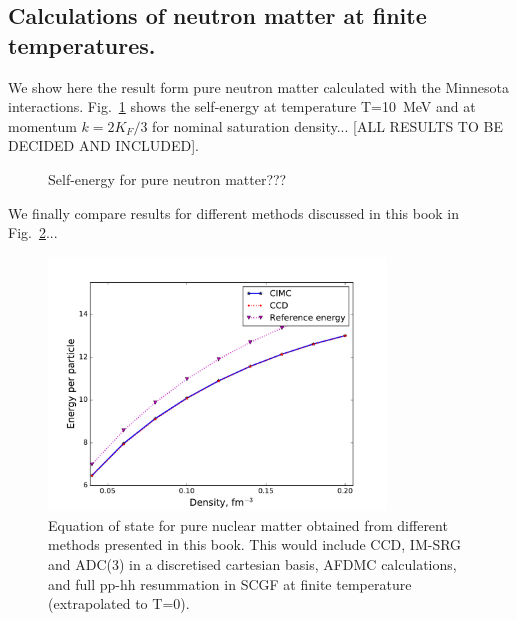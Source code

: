 \subsection{Calculations of neutron matter at finite temperatures.}
\label{sec:scgf_comp_finiteT}

We show here the result form pure neutron matter calculated with the Minnesota interactions. Fig.~\ref{fig:minn_SE} shows the self-energy at temperature
T=10~MeV and at momentum $k=2 K_F/3$  for nominal saturation density...  [ALL RESULTS TO BE DECIDED AND INCLUDED].

\begin{figure}[ht]
\begin{center}
\caption{Self-energy for pure neutron matter??? }
\label{fig:minn_SE}
\end{center}
\end{figure}


We finally compare results for different methods discussed in this book in Fig.~\ref{fig:minn_all}...

\begin{figure}[ht]
\begin{center}
\includegraphics[width=0.8\textwidth]{Chapter11-figures/cimcccd.pdf}
\caption{Equation of state for pure nuclear matter obtained from different methods presented in this book. This would include CCD, IM-SRG and ADC(3) in 
a discretised cartesian basis,  AFDMC calculations, and full pp-hh resummation in SCGF at finite temperature (extrapolated to T=0).}
\label{fig:minn_all}
\end{center}
\end{figure}




